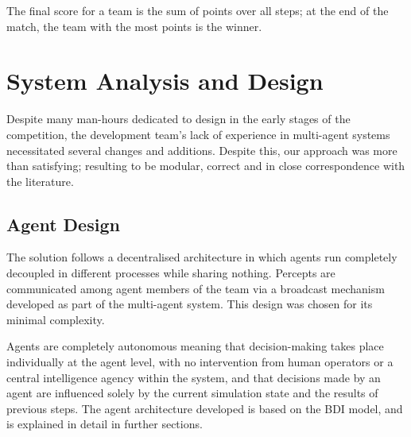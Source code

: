 \documentclass{llncs2e/llncs}
\begin{document}
    The final score for a team is the sum of points over all steps; at the end
    of the match, the team with the most points is the winner.

\section{System Analysis and Design}

\begin{comment}
PREGUNTAS {
1. If some multi-agent system methodology such as Prometheus, O-MaSE, or 
Tropos was used, how did you use it? 
   If you did not what were the reasons?
2. Is the solution based on the centralisation of coordination/information on 
a specific agent?
   Conversely if you plan a decentralised solution, which strategy do you plan 
to use?
3. What is the communication strategy and how complex is it?
4. How are the following agent features considered/implemented: autonomy, 
proactiveness, reactiveness?
5. Is the team a truly multi-agent system or rather a centralised system in 
disguise?
6. How much time (man hours) have you invested (approximately) for 
implementing your team?
7. Did you discuss the design and strategies of your agent team with other 
developers? 
   To which extent did your test your agents playing with other teams?
}
\end{comment}

    Despite many man-hours dedicated to design in the early stages of
    the competition, the development team's lack of experience in multi-agent
    systems necessitated several changes and additions. 
    Despite this, our approach was more than satisfying; resulting to be
    modular, correct and in close correspondence with the literature.

\subsection{Agent Design}

    The solution follows a decentralised architecture in which agents run 
    completely decoupled in different processes while sharing nothing. Percepts 
    are communicated among agent members of the team via a broadcast mechanism 
    developed as part of the multi-agent system. This design was chosen for its 
    minimal complexity.

    Agents are completely autonomous meaning that decision-making takes place 
    individually at the agent level, with no intervention from human operators or 
    a central intelligence agency within the system, and that decisions made by an 
    agent are influenced solely by the current simulation state and the results of 
    previous steps.
    The agent architecture developed is based on the BDI model, and is explained in
    detail in further sections.
\end{document}
